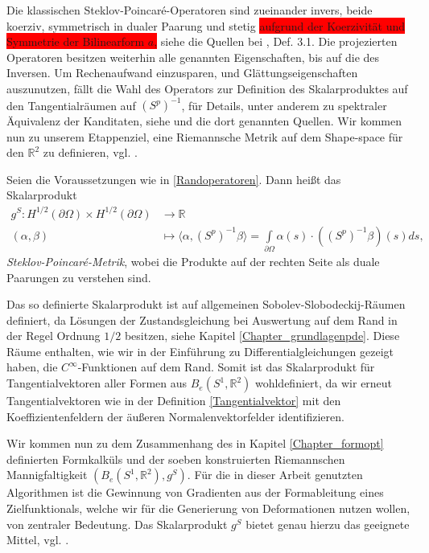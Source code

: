 Die klassischen Steklov-Poincaré-Operatoren sind zueinander invers, beide koerziv, symmetrisch in dualer Paarung und stetig \colorbox{red}{aufgrund der Koerzivität und Symmetrie der Bilinearform $a$,} siehe die Quellen bei \cite{bfgs2}, Def. 3.1. Die projezierten Operatoren besitzen weiterhin alle genannten Eigenschaften, bis auf die des Inversen. Um Rechenaufwand einzusparen, und Glättungseigenschaften auszunutzen, fällt die Wahl des Operators zur Definition des Skalarproduktes auf den Tangentialräumen auf $(S^p)^{-1}$, für Details, unter anderem zu spektraler Äquivalenz der Kanditaten, siehe \cite{bfgs1} und die dort genannten Quellen. Wir kommen nun zu unserem Etappenziel, eine Riemannsche Metrik auf dem Shape-space für den $\mathbb{R}^2$ zu definieren, vgl. \cite{bfgs2}.

\begin{defi}\label{Stek-Poi-metrik}
Seien die Voraussetzungen wie in \ref{Randoperatoren}. Dann heißt das Skalarprodukt
\begin{align*}
	g^S: H^{1/2}(\partial \Omega) \times H^{1/2}(\partial \Omega) &\rightarrow \mathbb{R} \\
	(\alpha,\beta) &\mapsto \langle \alpha, (S^p)^{-1}\beta \rangle = \underset{\partial \Omega}{\int} \alpha(s)\cdot((S^p)^{-1}\beta)(s)ds,
\end{align*}
\textit{Steklov-Poincaré-Metrik}, wobei die Produkte auf der rechten Seite als duale Paarungen zu verstehen sind. 
\end{defi}

Das so definierte Skalarprodukt ist auf allgemeinen Sobolev-Slobodeckij-Räumen definiert, da Lösungen der Zustandsgleichung bei Auswertung auf dem Rand in der Regel Ordnung $1/2$ besitzen, siehe Kapitel \ref{Chapter_grundlagenpde}. Diese Räume enthalten, wie wir in der Einführung zu Differentialgleichungen gezeigt haben, die $C^\infty$-Funktionen auf dem Rand. Somit ist das Skalarprodukt für Tangentialvektoren aller Formen aus $B_e(S^1, \mathbb{R}^2)$ wohldefiniert, da wir erneut Tangentialvektoren wie in der Definition \ref{Tangentialvektor} mit den Koeffizientenfeldern der äußeren Normalenvektorfelder identifizieren.

Wir kommen nun zu dem Zusammenhang des in Kapitel \ref{Chapter_formopt} definierten Formkalküls und der soeben konstruierten Riemannschen Mannigfaltigkeit $(B_e(S^1,\mathbb{R}^2),g^S)$.
Für die in dieser Arbeit genutzten Algorithmen ist die Gewinnung von Gradienten aus der Formableitung eines Zielfunktionals, welche wir für die Generierung von Deformationen nutzen wollen, von zentraler Bedeutung. Das Skalarprodukt $g^S$ bietet genau hierzu das geeignete Mittel, vgl. \cite{bfgs2}.

